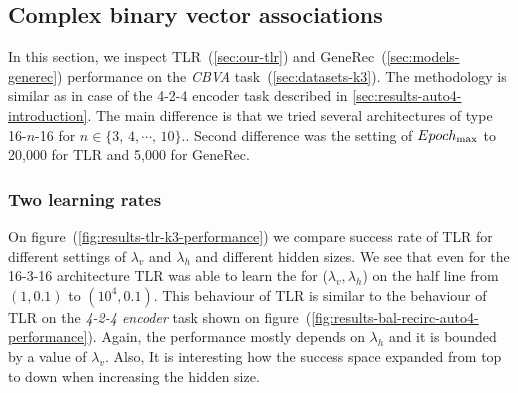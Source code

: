 

\subsection{Complex binary vector associations} 
\label{sec:results-k3}

In this section, we inspect TLR~(\ref{sec:our-tlr}) and GeneRec~(\ref{sec:models-generec}) performance on the \emph{CBVA} task~(\ref{sec:datasets-k3}). The methodology is similar as in case of the 4-2-4 encoder task described in \ref{sec:results-auto4-introduction}. The main difference is that we tried several architectures of type 16-$n$-16 for $n \in \{3,\,4,\cdots,\,10\}.$. Second difference was the setting of $Epoch_{\rm max}$ to 20,000 for TLR and 5,000 for GeneRec. 

\subsubsection{Two learning rates} 
\label{sec:tlr-k3}

On figure~(\ref{fig:results-tlr-k3-performance}) we compare success rate of TLR for different settings of $\lambda_v$ and $\lambda_h$ and different hidden sizes. We see that even for the 16-3-16 architecture TLR was able to learn the for ($\lambda_v, \lambda_h$) on the half line from  $(1, 0.1)$ to $(10^4, 0.1)$. This behaviour of TLR is similar to the behaviour of TLR on the \emph{4-2-4 encoder} task shown on figure~(\ref{fig:results-bal-recirc-auto4-performance}). Again, the performance mostly depends on $\lambda_h$ and it is bounded by a value of $\lambda_v$. Also, It is interesting how the success space expanded from top to down when increasing the hidden size.


